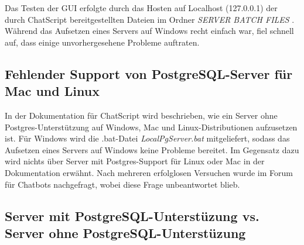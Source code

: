 Das Testen der GUI erfolgte durch das Hosten auf Localhost (127.0.0.1) der durch ChatScript bereitgestellten Dateien im Ordner \textit{SERVER BATCH FILES} \citep{chatscript2019}. Während das Aufsetzen eines Servers auf Windows recht einfach war, fiel schnell auf, dass einige unvorhergesehene Probleme auftraten. 

\subsection{Fehlender Support von PostgreSQL-Server für Mac und Linux}
\label{sec:Fehlender Support von PostgreSQL-Server für Mac und Linux}

In der Dokumentation für ChatScript wird beschrieben, wie ein Server ohne Postgres-Unterstützung auf Windows, Mac und Linux-Distributionen aufzusetzen ist. Für Windows wird die .bat-Datei \textit{LocalPgServer.bat} mitgeliefert, sodass das Aufsetzen eines Servers auf Windows keine Probleme bereitet. Im Gegensatz dazu wird nichts über Server mit Postgres-Support für Linux oder Mac in der Dokumentation erwähnt. Nach mehreren erfolglosen Versuchen wurde im Forum für Chatbots \cite{cb5} nachgefragt, wobei diese Frage unbeantwortet blieb. 

\subsection{Server mit PostgreSQL-Unterstüzung vs. Server ohne PostgreSQL-Unterstüzung}
\label{sec: Server mit PostgreSQL-Unterstüzung vs. Server ohne PostgreSQL-Unterstüzung}

